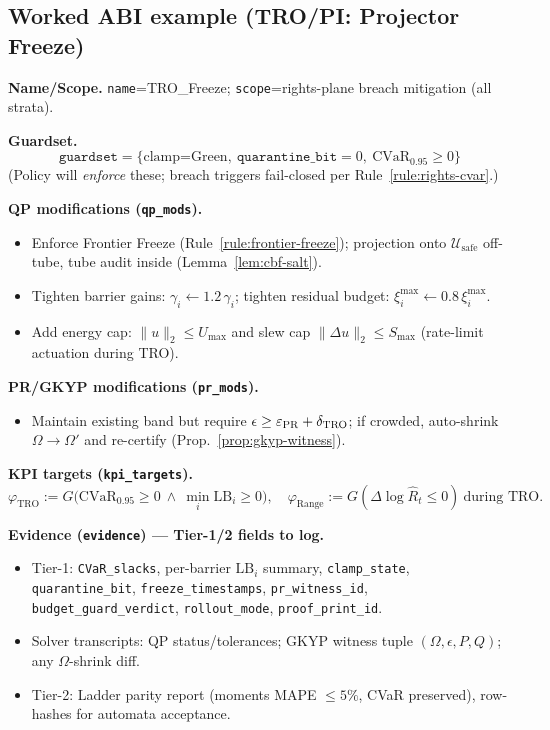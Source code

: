 \subsection{Worked ABI example (TRO/PI: Projector Freeze)}\label{subsec:lever-example}
\emph{}

\noindent\textbf{Name/Scope.} \texttt{name}=\textsf{TRO\_Freeze}; \texttt{scope}=\textsf{rights-plane breach mitigation (all strata)}.

\smallskip
\noindent\textbf{Guardset.}
\[
\texttt{guardset}=\{\text{clamp=Green},\ \texttt{quarantine\_bit}=0,\ \mathrm{CVaR}_{0.95}\ge0\}
\]
(Policy will \emph{enforce} these; breach triggers fail-closed per Rule~\ref{rule:rights-cvar}.)

\smallskip
\noindent\textbf{QP modifications (\texttt{qp\_mods}).}
\begin{itemize}[leftmargin=*]
\item Enforce Frontier Freeze (Rule~\ref{rule:frontier-freeze}); projection onto $\mathcal U_{\mathrm{safe}}$ off-tube, tube audit inside (Lemma~\ref{lem:cbf-salt}).
\item Tighten barrier gains: $\gamma_i\!\leftarrow\!1.2\,\gamma_i$; tighten residual budget: $\xi_i^{\max}\!\leftarrow\!0.8\,\xi_i^{\max}$.
\item Add energy cap: $\|u\|_2\le U_{\max}$ and slew cap $\|\Delta u\|_2\le S_{\max}$ (rate-limit actuation during TRO).
\end{itemize}

\noindent\textbf{PR/GKYP modifications (\texttt{pr\_mods}).}
\begin{itemize}[leftmargin=*]
\item Maintain existing band but require $\epsilon\ge\varepsilon_{\mathrm{PR}}+\delta_{\mathrm{TRO}}$; if crowded, auto-shrink $\Omega\!\to\!\Omega'$ and re-certify (Prop.~\ref{prop:gkyp-witness}).
\end{itemize}

\noindent\textbf{KPI targets (\texttt{kpi\_targets}).}
\[
\varphi_{\text{TRO}}:=G\big(\mathrm{CVaR}_{0.95}\!\ge0\ \wedge\ \min_i \mathrm{LB}_i\!\ge0\big),\quad
\varphi_{\text{Range}}:=G(\Delta\log\hat R_t\le 0)\ \text{during TRO}.
\]

\noindent\textbf{Evidence (\texttt{evidence}) — Tier-1/2 fields to log.}
\begin{itemize}[leftmargin=*]
\item Tier-1: \texttt{CVaR\_slacks}, per-barrier $\mathrm{LB}_i$ summary, \texttt{clamp\_state}, \texttt{quarantine\_bit}, \texttt{freeze\_timestamps}, \texttt{pr\_witness\_id}, \texttt{budget\_guard\_verdict}, \texttt{rollout\_mode}, \texttt{proof\_print\_id}.
\item Solver transcripts: QP status/tolerances; GKYP witness tuple $(\Omega,\epsilon,P,Q)$; any $\Omega$-shrink diff.
\item Tier-2: Ladder parity report (moments MAPE $\le5\%$, CVaR preserved), row-hashes for automata acceptance.
\end{itemize}


